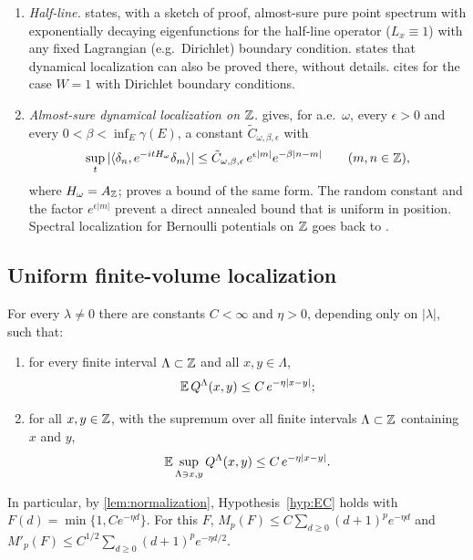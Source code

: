 \begin{remark}
\begin{enumerate}[label=(\arabic*)]
\cite[Eq.~(6)]{Macera2023}, \cite[Eq.~(23)]{MaceraSodin2022}.
\item \emph{Half-line.}  \cite[Thm.~4]{MaceraSodin2022} states, with a sketch of proof, almost-sure
pure point spectrum with exponentially decaying eigenfunctions for the half-line operator ($L_x\equiv1$)
with any fixed Lagrangian (e.g.\ Dirichlet) boundary condition.  \cite[Rem.~4.1(2)]{MaceraSodin2022} states that dynamical localization
can also be proved there, without details.  \cite[Rem.~4.1(3)]{MaceraSodin2022} cites
\cite{GorodetskiKleptsyn2021} for the case $W=1$ with Dirichlet boundary conditions.
\item \emph{Almost-sure dynamical localization on $\mathbb{Z}$.}  \cite[Thm.~6.4]{Bucaj2019} gives, for a.e.\
$\omega$, every $\epsilon>0$ and every $0<\beta<\inf_E\gamma(E)$, a constant $\tilde C_{\omega,\beta,\epsilon}$ with
\[
  \sup_t|\langle\delta_n,e^{-itH_\omega}\delta_m\rangle|\le\tilde C_{\omega,\beta,\epsilon}\,e^{\epsilon|m|}e^{-\beta|n-m|}\qquad(m,n\in\mathbb{Z}),
\]
where $H_\omega=A_{\mathbb{Z}}$; \cite[Sect.~6]{JZ2019} proves a bound of the same form.  The random
constant and the factor $e^{\epsilon|m|}$ prevent a direct annealed bound that is uniform in position.
Spectral localization for Bernoulli potentials on $\mathbb{Z}$ goes back to \cite{CKM1987}.
\end{enumerate}
\end{remark}

\subsection{Uniform finite-volume localization}\label{sec:onebody:EC}

\begin{theorem}\label{thm:EC}
For every $\lambda\ne0$ there are constants $C<\infty$ and $\eta>0$, depending only on $|\lambda|$, such that:
\begin{enumerate}[label=(\roman*)]
\item for every finite interval $\Lambda\subset\mathbb{Z}$ and all $x,y\in\Lambda$,
\begin{equation}\label{eq:ECmain}
  \mathbb{E}\,Q^\Lambda(x,y)\le C\,e^{-\eta|x-y|};
\end{equation}
\item for all $x,y\in\mathbb{Z}$, with the supremum over all finite intervals $\Lambda\subset\mathbb{Z}$ containing $x$ and $y$,
\begin{equation}\label{eq:ECsup}
  \mathbb{E}\sup_{\Lambda\ni x,y}Q^\Lambda(x,y)\le C\,e^{-\eta|x-y|}.
\end{equation}
\end{enumerate}
In particular, by \cref{lem:normalization}, Hypothesis~\ref{hyp:EC} holds with $F(d)=\min\{1,Ce^{-\eta d}\}$.  For
this $F$, $M_p(F)\le C\sum_{d\ge0}(d+1)^pe^{-\eta d}$ and $M'_p(F)\le C^{1/2}\sum_{d\ge0}(d+1)^pe^{-\eta d/2}$.
\end{theorem}

